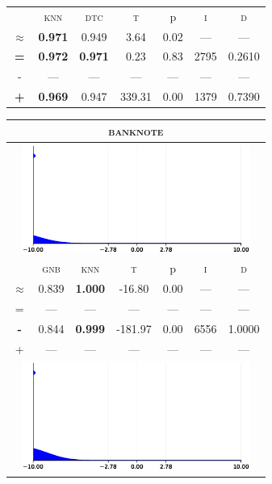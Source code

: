 \begin{tabular}{c||cc||c|c|c||c}
\midrule	&\textsc{knn} & \textsc{dtc} & \textsc{t} & p & \textsc{i} & \textsc{d}\\
	\color{red} $\approx$ & \color{red} \bfseries 0.971 &\color{red}   0.949 & 3.64 & 0.02 & --- & ---\\\midrule
	{\bfseries\color{black}\tiny=}& \color{black} \bfseries 0.972 & \color{black} \bfseries 0.971 & 0.23 & 0.83 & 2795 & \color{black} 0.2610\\
	{\tiny-}& --- & --- & --- & --- & --- & ---\\
	{\bfseries\color{red}\tiny+}& \color{red} \bfseries 0.969 & \color{red}  0.947 & 339.31 & 0.00 & 1379 & \color{red} 0.7390\\
\bottomrule\end{tabular}


\begin{tabular}{c||cc||c|c|c||c}
	\toprule
	\multicolumn{7}{c}{\textsc{banknote}}\\
	\bottomrule
	\multicolumn{7}{c}{\includegraphics[width=7.5cm, trim=30 0 30 0]{figures/banknote_0.eps}}\\

\midrule	&\textsc{gnb} & \textsc{knn} & \textsc{t} & p & \textsc{i} & \textsc{d}\\
	\color{blue} $\approx$ & \color{blue}  0.839 &\color{blue}  \bfseries 1.000 & -16.80 & 0.00 & --- & ---\\\midrule
	{\tiny=}& --- & --- & --- & --- & --- & ---\\
	{\bfseries\color{blue}\tiny-}& \color{blue}  0.844 & \color{blue} \bfseries 0.999 & -181.97 & 0.00 & 6556 & \color{blue} 1.0000\\
	{\tiny+}& --- & --- & --- & --- & --- & ---\\
	\bottomrule
	\multicolumn{7}{c}{\includegraphics[width=7.5cm, trim=30 0 30 0]{figures/banknote_1.eps}}\\


\end{tabular}
